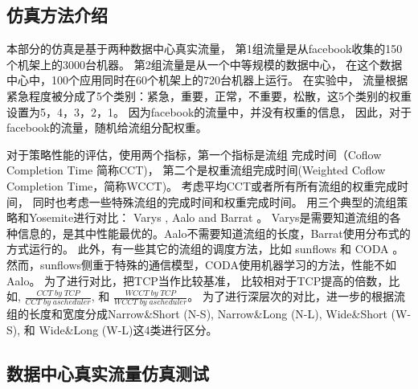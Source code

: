 \subsection{仿真方法介绍}
本部分的仿真是基于两种数据中心真实流量，
第1组流量是从facebook收集的150个机架上的3000台机器\cite{chowdhury2014efficient}。
第2组流量是从一个中等规模的数据中心，
在这个数据中心中，100个应用同时在60个机架上的720台机器上运行。
在实验中，
流量根据紧急程度被分成了5个类别：紧急，重要，正常，不重要，松散，这5个类别的权重设置为5，4，3，2，1。
因为facebook的流量中，并没有权重的信息，
因此，对于facebook的流量，随机给流组分配权重。

对于策略性能的评估，使用两个指标，第一个指标是流组 完成时间（Coflow Completion Time 简称CCT)，
第二个是权重流组完成时间(Weighted Coflow Completion Time，简称WCCT)。
考虑平均CCT或者所有所有流组的权重完成时间，
同时也考虑一些特殊流组的完成时间和权重完成时间。
用三个典型的流组策略和Yosemite进行对比：
Varys \cite{chowdhury2014efficient}, Aalo \cite{chowdhury2015efficient} and Barrat \cite{dogar2014decentralized}。
Varys是需要知道流组的各种信息的，是其中性能最优的。Aalo不需要知道流组的长度，Barrat使用分布式的方式运行的。
此外，有一些其它的流组的调度方法，比如 sunflows \cite{huang2016sunflow} 和 CODA \cite{zhang2016coda}。
然而，sunflows侧重于特殊的通信模型，CODA使用机器学习的方法，性能不如Aalo。
为了进行对比，把TCP当作比较基准，
比较相对于TCP提高的倍数，比如, $\frac{CCT\; by\; TCP}{CCT\; by\; a scheduler}$, 和 $\frac{WCCT\; by\; TCP}{WCCT\; by\; a scheduler}$。
为了进行深层次的对比，进一步的根据流组的长度和宽度分成Narrow\&Short (N-S), Narrow\&Long (N-L), Wide\&Short (W-S), 和 Wide\&Long (W-L)这4类进行区分。


\subsection{数据中心真实流量仿真测试}


